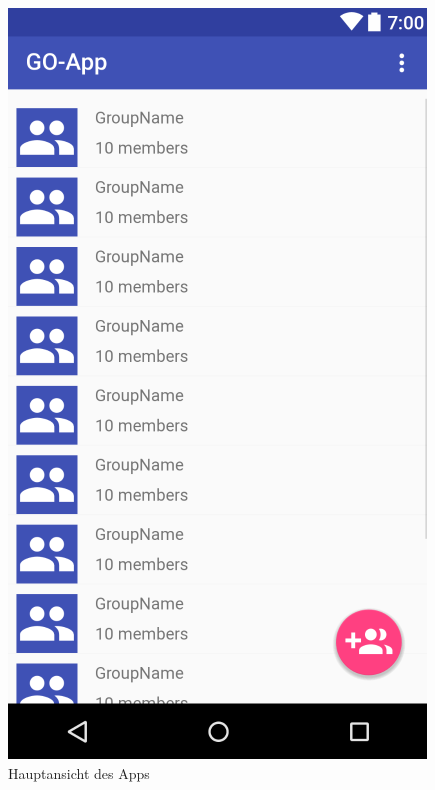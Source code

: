 \documentclass[parskip=full]{scrartcl}
\begin{document}
\begin{figure}[H]
	\centering
	\includegraphics[width=.7\textwidth]{GUI/AndroidStudio/hauptansicht.PNG}
	\caption{Hauptansicht des Apps}	
\end{figure}
\end{document}
